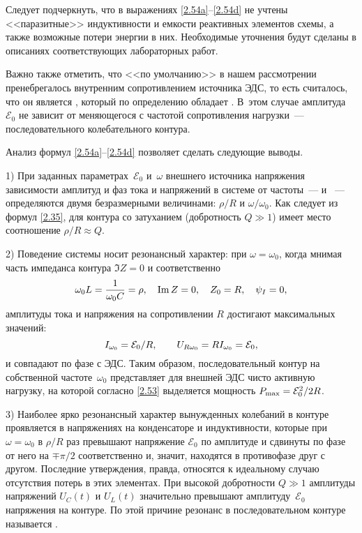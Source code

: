 Следует подчеркнуть, что в выражениях \eqref{2.54a}--\eqref{2.54d} не учтены
<<паразитные>> индуктивности и емкости реактивных элементов схемы, а также
возможные потери энергии в них. Необходимые уточнения будут сделаны в описаниях
соответствующих лабораторных работ.

Важно также отметить, что <<по умолчанию>> в нашем рассмотрении пренебрегалось
внутренним сопротивлением источника ЭДС, то есть считалось, что он является
, который по определению обладает
. В~этом случае амплитуда
$\mathcal{E}_0$ не зависит от меняющегося с частотой сопротивления
нагрузки~--- последовательного колебательного контура.

Анализ формул \eqref{2.54a}--\eqref{2.54d} позволяет сделать следующие выводы.

1) При заданных параметрах~$\mathcal{E}_0$ и~$\omega$ внешнего источника
напряжения зависимости амплитуд и фаз тока и напряжений в системе от
частоты~---  и ~--- определяются двумя безразмерными величинами: $\rho/R$ и
$\omega/\omega_0$. Как следует из формул \eqref{2.35}, для контура
со  затуханием (добротность $Q\gg1$) имеет
место соотношение $\rho/R\approx Q$.


2) Поведение системы носит резонансный характер: при $\omega=\omega_0$, когда
мнимая часть импеданса контура $\Im Z=0$ и соответственно
\begin{equation}\eqmark{2.55}
	\omega_0L=\frac{1}{\omega_0C}=\rho, \quad \Im Z=0, \quad Z_0 = R, \quad \psi_I = 0,
\end{equation}
амплитуды тока и напряжения на сопротивлении $R$ достигают максимальных значений:
\begin{equation}\eqmark{2.56}
	I_{\omega_0}=\mathcal{E}_0/R, \qquad
U_{R\omega_0}=RI_{\omega_0}=\mathcal{E}_0,
\end{equation}
и совпадают по фазе с ЭДС. Таким образом, последовательный
контур на собственной частоте~$\omega_0$ представляет для внешней ЭДС чисто
активную нагрузку, на которой согласно \eqref{2.53} выделяется мощность
$P_{\rm max}=\mathcal{E}_0^2/2R$.

3) Наиболее ярко резонансный характер вынужденных колебаний в
 контуре проявляется в напряжениях на конденсаторе и
индуктивности, которые при $\omega=\omega_0$ в $\rho/R$ раз превышают напряжение
$\mathcal{E}_0$ по амплитуде и сдвинуты по фазе от него на $\mp\pi/2$
соответственно и, значит, находятся в противофазе друг с другом. Последние
утверждения, правда, относятся к идеальному случаю отсутствия потерь в этих
элементах. При высокой добротности $Q\gg1$ амплитуды напряжений $U_C(t)$ и
$U_L(t)$ значительно превышают амплитуду~$\mathcal{E}_0$ напряжения на контуре.
По этой причине резонанс в последовательном контуре называется
.

